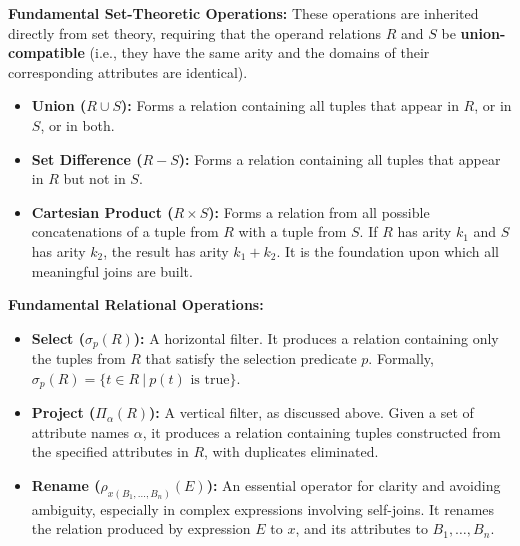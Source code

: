 \noindent\textbf{Fundamental Set-Theoretic Operations:}
These operations are inherited directly from set theory, requiring that the operand relations $R$ and $S$ be \textbf{union-compatible} (i.e., they have the same arity and the domains of their corresponding attributes are identical).
\begin{itemize}
    \item \textbf{Union ($R \cup S$):} Forms a relation containing all tuples that appear in $R$, or in $S$, or in both.
    \item \textbf{Set Difference ($R - S$):} Forms a relation containing all tuples that appear in $R$ but not in $S$.
    \item \textbf{Cartesian Product ($R \times S$):} Forms a relation from all possible concatenations of a tuple from $R$ with a tuple from $S$. If $R$ has arity $k_1$ and $S$ has arity $k_2$, the result has arity $k_1+k_2$. It is the foundation upon which all meaningful joins are built.
\end{itemize}

\noindent\textbf{Fundamental Relational Operations:}
\begin{itemize}
    \item \textbf{Select ($\sigma_{p}(R)$):} A horizontal filter. It produces a relation containing only the tuples from $R$ that satisfy the selection predicate $p$. Formally, $\sigma_{p}(R) = \{t \in R \ | \ p(t) \text{ is true}\}$.
    \item \textbf{Project ($\Pi_{\alpha}(R)$):} A vertical filter, as discussed above. Given a set of attribute names $\alpha$, it produces a relation containing tuples constructed from the specified attributes in $R$, with duplicates eliminated.
    \item \textbf{Rename ($\rho_{x(B_1, \dots, B_n)}(E)$):} An essential operator for clarity and avoiding ambiguity, especially in complex expressions involving self-joins. It renames the relation produced by expression $E$ to $x$, and its attributes to $B_1, \dots, B_n$.
\end{itemize}

